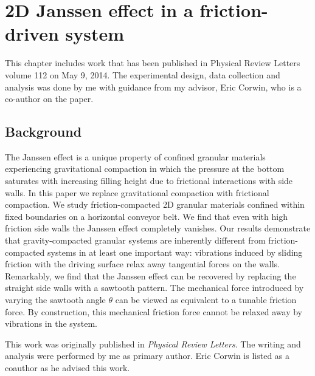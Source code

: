 \chapter{2D Janssen effect in a friction-driven system}
\author{Mohammad Yasinul Karim, Eric I. Corwin}


This chapter includes work that has been published in Physical Review Letters volume 112 on May 9, 2014. The experimental design, data collection and analysis was done by me with guidance from my advisor, Eric Corwin, who is a co-author on the paper. 

\section{Background}

The Janssen effect is a unique property of confined granular materials experiencing gravitational compaction in which the pressure at the bottom saturates with increasing filling height due to frictional interactions with side walls. In this paper we replace gravitational compaction with frictional compaction.  We study friction-compacted 2D granular materials confined within fixed boundaries on a horizontal conveyor belt. We find that even with high friction side walls the Janssen effect completely vanishes. Our results demonstrate that gravity-compacted granular systems are inherently different from friction-compacted systems in at least one important way: vibrations induced by sliding friction with the driving surface relax away tangential forces on the walls. Remarkably, we find that the Janssen effect can be recovered by replacing the straight side walls with a sawtooth pattern. The mechanical force introduced by varying the sawtooth angle $\theta$ can be viewed as equivalent to a tunable friction force. By construction, this mechanical friction force cannot be relaxed away by vibrations in the system.

This work was originally published in \textit{Physical Review Letters}.  The writing and analysis were performed by me as primary author.  Eric Corwin is listed as a coauthor as he advised this work.  

